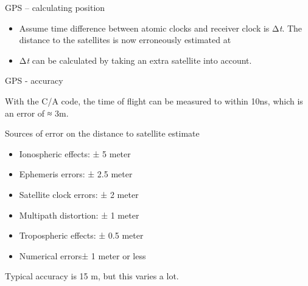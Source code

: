 \documentclass[compress]{beamer}
\begin{document}
\begin{frame}{GPS -- calculating position}

\begin{itemize}

\item
  Assume time difference between atomic clocks and receiver clock is
  Δ\emph{t}. The distance to the satellites is now erroneously estimated
  at
\item
  Δ\emph{t} can be calculated by taking an extra satellite into account.
\end{itemize}

\end{frame}

\begin{frame}{GPS - accuracy}

With the C/A code, the time of flight can be measured to within 10ns,
which is an error of ≈ 3m.

Sources of error on the distance to satellite estimate

\begin{itemize}

\item
  Ionospheric effects: ± 5 meter
\item
  Ephemeris errors: ± 2.5 meter
\item
  Satellite clock errors: ± 2 meter
\item
  Multipath distortion: ± 1 meter
\item
  Tropospheric effects: ± 0.5 meter
\item
  Numerical errors± 1 meter or less
\end{itemize}

Typical accuracy is 15 m, but this varies a lot.

\end{frame}
\end{document}
